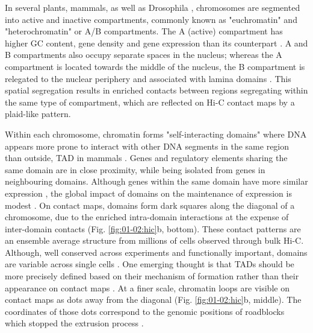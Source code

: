 In several plants, mammals, as well as Drosophila \cite{dong3DChromatinArchitecture2017,lieberman-aidenComprehensiveMappingLongRange2009,rowleyEvolutionarilyConservedPrinciples2017}, chromosomes are segmented into active and inactive compartments, commonly known as "euchromatin" and "heterochromatin" or A/B compartments. The A (active) compartment has higher GC content, gene density and gene expression than its counterpart \cite{lieberman-aidenComprehensiveMappingLongRange2009,krietensteinUltrastructuralDetailsMammalian2020}. A and B compartments also occupy separate spaces in the nucleus; whereas the A compartment is located towards the middle of the nucleus, the B compartment is relegated to the nuclear periphery and associated with lamina domains \cite{vansteenselLaminaAssociatedDomainsLinks2017}. This spatial segregation results in enriched contacts between regions segregating within the same type of compartment, which are reflected on Hi-C contact maps by a plaid-like pattern. 

Within each chromosome, chromatin forms "self-interacting domains" where DNA appears more prone to interact with other DNA segments in the same region than outside, \acrfull{TAD} in mammals \cite{dixonTopologicalDomainsMammalian2012,noraSpatialPartitioningRegulatory2012,houGeneDensityTranscription2012}. Genes and regulatory elements sharing the same domain are in close proximity, while being isolated from genes in neighbouring domains. Although genes within the same domain have more similar expression \cite{noraSpatialPartitioningRegulatory2012}, the global impact of domains on the maintenance of expression is modest \cite{raoCohesinLossEliminates2017}. On contact maps, domains form dark squares along the diagonal of a chromosome, due to the enriched intra-domain interactions at the expense of inter-domain contacts (Fig. \ref{fig:01-02:hic}b, bottom). These contact patterns are an ensemble average structure from millions of cells observed through bulk Hi-C. Although, well conserved across experiments and functionally important, domains are variable across single cells \cite{stevens3DStructuresIndividual2017}. One emerging thought is that \acrshort{TAD}s should be more precisely defined based on their mechanism of formation rather than their appearance on contact maps \cite{beaganExistenceFunctionalityTopologically2020,changTADsTheirBorders2020,dewitTADsCallerCalls2020}. At a finer scale, chromatin loops are visible on contact maps as dots away from the diagonal (Fig. \ref{fig:01-02:hic}b, middle). The coordinates of those dots correspond to the genomic positions of roadblocks which stopped the extrusion process \cite{baniganLoopExtrusionTheory2020,fudenbergFormationChromosomalDomains2016}.



